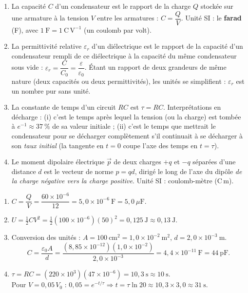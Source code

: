\documentclass[11pt]{article}
\newcommand{\cle}[1]{{\popxbold\color{popdark}#1}}
\begin{document}
\begin{corrige}
\begin{enumerate}
\item La \cle{capacité} $C$ d'un condensateur est le rapport de la charge $Q$ stockée sur une armature à la tension $V$ entre les armatures : $C = \dfrac{Q}{V}$. Unité SI : le \textbf{farad} (F), avec $1\ \mathrm{F} = 1\ \mathrm{C\,V^{-1}}$ (un coulomb par volt).
\item La \cle{permittivité relative} $\varepsilon_r$ d'un diélectrique est le rapport de la capacité d'un condensateur rempli de ce diélectrique à la capacité du même condensateur sous vide : $\varepsilon_r = \dfrac{C}{C_0} = \dfrac{\varepsilon}{\varepsilon_0}$. Étant un rapport de deux grandeurs de même nature (deux capacités ou deux permittivités), les unités se simplifient : $\varepsilon_r$ est un nombre pur sans unité.
\item La \cle{constante de temps} d'un circuit $RC$ est $\tau = RC$. Interprétations en décharge : (i) c'est le temps après lequel la tension (ou la charge) est tombée à $e^{-1} \approx 37\ \%$ de sa valeur initiale ; (ii) c'est le temps que mettrait le condensateur pour se décharger complètement s'il continuait à se décharger à son \emph{taux initial} (la tangente en $t=0$ coupe l'axe des temps en $t = \tau$).
\item Le \cle{moment dipolaire électrique} $\vec{p}$ de deux charges $+q$ et $-q$ séparées d'une distance $d$ est le vecteur de norme $p = qd$, dirigé le long de l'axe du dipôle \emph{de la charge négative vers la charge positive}. Unité SI : coulomb-mètre ($\mathrm{C\,m}$).
\end{enumerate}
\end{corrige}

\begin{corrige}
\begin{enumerate}
\item $C = \dfrac{Q}{V} = \dfrac{60\times10^{-6}}{12} = 5,0\times10^{-6}\ \mathrm{F} = 5,0\ \mu\mathrm{F}$.
\item $U = \tfrac{1}{2}CV^2 = \tfrac{1}{2}(100\times10^{-6})(50)^2 = 0,125\ \mathrm{J} \approx 0,13\ \mathrm{J}$.
\item Conversion des unités : $A = 100\ \mathrm{cm^2} = 1,0\times10^{-2}\ \mathrm{m^2}$, $d = 2,0\times10^{-3}\ \mathrm{m}$.
\[ C = \frac{\varepsilon_0 A}{d} = \frac{(8,85\times10^{-12})(1,0\times10^{-2})}{2,0\times10^{-3}} = 4,4\times10^{-11}\ \mathrm{F} = 44\ \mathrm{pF}. \]
\item $\tau = RC = (220\times10^{3})(47\times10^{-6}) = 10,3\ \mathrm{s} \approx 10\ \mathrm{s}$.\\
Pour $V = 0,05\,V_0$ : $0,05 = e^{-t/\tau} \Rightarrow t = \tau\ln 20 \approx 10,3 \times 3,0 \approx 31\ \mathrm{s}$.
\end{enumerate}
\end{corrige}
\end{document}
